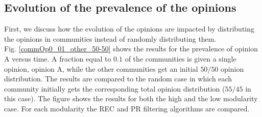 \documentclass[11 pt , letterpaper , twoside , openright]{book}
\begin{document}
\subsection{Evolution of the prevalence of the opinions}\label{groupVSrandomOP}

First, we discuss how the evolution of the opinions are impacted by distributing the opinions in communities instead of randomly distributing them.\\
\newline
Fig. \ref{commOp0_01_other_50-50} shows the results for the prevalence of opinion A versus time. A fraction equal to $0.1$ of the communities is given a single opinion, opinion A, while the other communities get an initial $50/50$ opinion distribution. The results are compared to the random case in which each community initially gets the corresponding total opinion distribution ($55/45$ in this case). The figure shows the results for both the high and the low modularity case. For each modularity the REC and PR filtering algorithms are compared.
\end{document}
